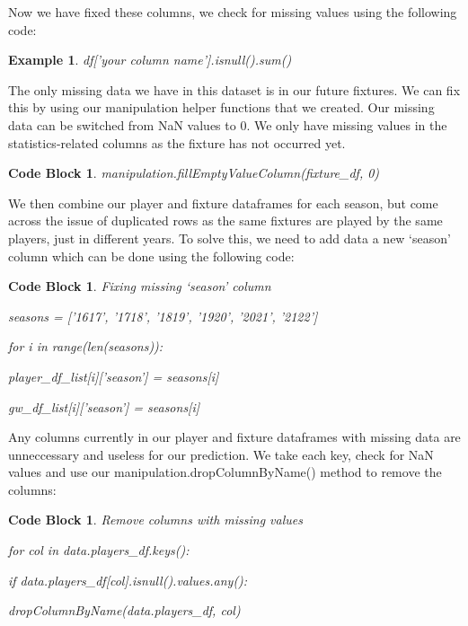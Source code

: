 \documentclass[12pt, a4paper, oneside]{book}
\newtheorem{example}[theorem]{Example}
\newtheorem{codeblock}[theorem]{Code Block}
\numberwithin{equation}{section}
\begin{document}
\vspace{0.5cm}

Now we have fixed these columns, we check for missing values using the following code:

\begin{example}
  df['your column name'].isnull().sum() \cite{Check for NaN}
\end{example}

The only missing data we have in this dataset is in our future fixtures. We can fix this by using our manipulation helper functions that we created. Our missing data can be switched from NaN values to 0. We only have missing values in the statistics-related columns as the fixture has not occurred yet.

\begin{codeblock}
  manipulation.fillEmptyValueColumn(fixture\_df, 0)
\end{codeblock}

\vspace{0.5cm}

We then combine our player and fixture dataframes for each season, but come across the issue of duplicated rows as the same fixtures are played by the same players, just in different years. To solve this, we need to add data a new `season' column which can be done using the following code:

\begin{codeblock}
  Fixing missing `season' column

  seasons = ['1617', '1718', '1819', '1920', '2021', '2122']
  
  for i in range(len(seasons)):
  
  \hspace{\parindent}player\_df\_list[i]['season'] = seasons[i]
  
  \hspace{\parindent}gw\_df\_list[i]['season'] = seasons[i]
\end{codeblock}

\vspace{0.5cm}

Any columns currently in our player and fixture dataframes with missing data are unneccessary and useless for our prediction. We take each key, check for NaN values and use our manipulation.dropColumnByName() method to remove the columns:

\begin{codeblock}
  Remove columns with missing values
  
  for col in data.players\_df.keys():
  
  \hspace{\parindent}if data.players\_df[col].isnull().values.any():
  
  \hspace{\parindent}\hspace{\parindent}dropColumnByName(data.players\_df, col)
\end{codeblock}
\end{document}
